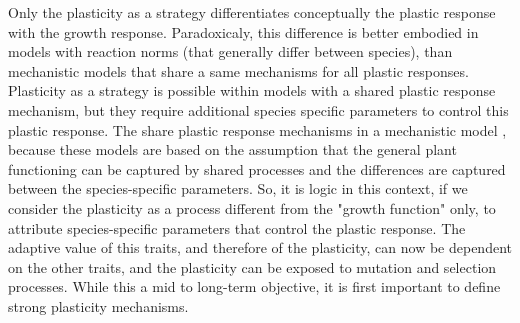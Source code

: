 Only the plasticity as a strategy differentiates conceptually the plastic response with the growth response. Paradoxicaly, this difference is better embodied in models with reaction norms (that generally differ between species), than mechanistic models that share a same mechanisms for all plastic responses. Plasticity as a strategy is possible within models with a shared plastic response mechanism, but they require additional species specific parameters to control this plastic response. The share plastic response mechanisms in a mechanistic model \cite{lohier_explaining_2014}, because these models are based on the assumption that the general plant functioning can be captured by shared processes and the differences are captured between the species-specific parameters. So, it is logic in this context, if we consider the plasticity as a process different from the "growth function" only, to attribute species-specific parameters that control the plastic response. The adaptive value of this traits, and therefore of the plasticity, can now be dependent on the other traits, and the plasticity can be exposed to mutation and selection processes. While this a mid to long-term objective, it is first important to define strong plasticity mechanisms.

%
%






%

